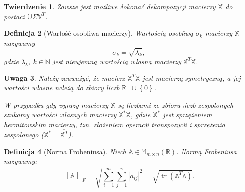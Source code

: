 \documentclass[12pt,a4paper]{report}
\newtheorem{df}{Definicja}[chapter]
\newtheorem{tw}[df]{Twierdzenie}
\newtheorem{uwaga}[df]{Uwaga}
\newcommand{\set}[1]{\left\lbrace {#1} \right\rbrace}
\newcommand{\setR}{\mathbb{R}}
\newcommand{\setN}{\mathbb{N}}
\newcommand{\norm}[2][]{\left\| {#2} \right\|_{#1}}
\newcommand{\tr}[1]{\operatorname{tr}\left({#1} \right)}
\begin{document}
\begin{tw}
Zawsze jest możliwe dokonać dekompozycji macierzy $\mathbb{X}$ do postaci $\mathbb{U} \Sigma \mathbb{V}^T$.
\end{tw}

\begin{df}[Wartość osobliwa macierzy]
Wartością osobliwą $\sigma_k$ macierzy $\mathbb{X}$ nazywamy
$$
\sigma_k = \sqrt{\lambda_k},
$$
gdzie $\lambda_k, \: k \in \setN$ jest nieujemną wartością własną macierzy $\mathbb{X}^T \mathbb{X}$.
\end{df}
\begin{uwaga}
Należy zauważyć, że macierz $\mathbb{X}^T \mathbb{X}$ jest macierzą symetryczną, a jej wartości własne należą do zbiory liczb $\setR_{+} \cup \set{0}$.

W przypadku gdy wyrazy macierzy $\mathbb{X}$ są liczbami ze zbioru liczb zespolonych szukamy wartości własnych macierzy $\mathbb{X}^*\mathbb{X}$, gdzie $\mathbb{X}^*$ jest sprzężeniem hermitowskim macierzy, tzn. złożeniem operacji transpozycji i sprzężenia zespolonego ($\mathbb{X}^* = \overline{\mathbb{X}^T}$).
\end{uwaga}

\begin{df}[Norma Frobeniusa{\citep{ulafiir}}] %
Niech $\mathbb{A}\in \mathbb{M}_{m\times n}(\mathbb{R})$. Normą Frobeniusa nazywamy:
$$
{\norm{\mathbb{A}}}_F = \sqrt{\sum_{i=1}^m \sum_{j=1}^n |a_{ij}|^2} = \sqrt{\tr{\mathbb{A}^T \mathbb{A}}}.
$$
\end{df}
\end{document}
